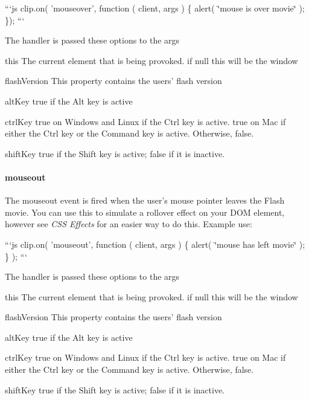 ```js clip.\-on( 'mouseover', function ( client, args ) \{ alert( \char`\"{}mouse is over movie\char`\"{} ); \}); ```

The handler is passed these options to the {\ttfamily args}


\begin{DoxyDescription}
\item[this ]The current element that is being provoked. if null this will be the window 
\item[flash\-Version ]This property contains the users' flash version 
\item[alt\-Key ]{\ttfamily true} if the Alt key is active 
\item[ctrl\-Key ]{\ttfamily true} on Windows and Linux if the Ctrl key is active. {\ttfamily true} on Mac if either the Ctrl key or the Command key is active. Otherwise, {\ttfamily false}. 
\item[shift\-Key ]{\ttfamily true} if the Shift key is active; {\ttfamily false} if it is inactive. 
\end{DoxyDescription}

\paragraph*{mouseout}

The {\ttfamily mouseout} event is fired when the user's mouse pointer leaves the Flash movie. You can use this to simulate a rollover effect on your D\-O\-M element, however see {\itshape C\-S\-S Effects} for an easier way to do this. Example use\-:

```js clip.\-on( 'mouseout', function ( client, args ) \{ alert( \char`\"{}mouse has left movie\char`\"{} ); \} ); ```

The handler is passed these options to the {\ttfamily args}


\begin{DoxyDescription}
\item[this ]The current element that is being provoked. if null this will be the window 
\item[flash\-Version ]This property contains the users' flash version 
\item[alt\-Key ]{\ttfamily true} if the Alt key is active 
\item[ctrl\-Key ]{\ttfamily true} on Windows and Linux if the Ctrl key is active. {\ttfamily true} on Mac if either the Ctrl key or the Command key is active. Otherwise, {\ttfamily false}. 
\item[shift\-Key ]{\ttfamily true} if the Shift key is active; {\ttfamily false} if it is inactive. 
\end{DoxyDescription}

